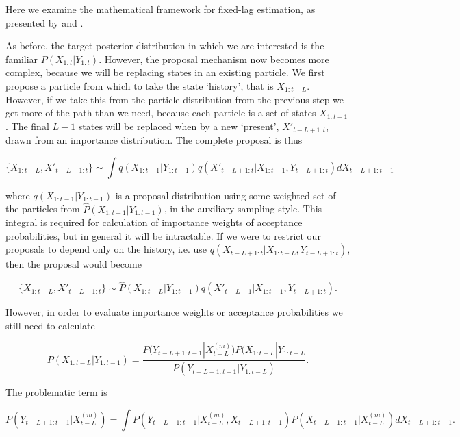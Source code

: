 Here we examine the mathematical framework for fixed-lag estimation, as presented by \cite{Doucet2006} and \cite{Briers2006}.

As before, the target posterior distribution in which we are interested is the familiar $P(X_{1:t}|Y_{1:t})$. However, the proposal mechanism now becomes more complex, because we will be replacing states in an existing particle. We first propose a particle from which to take the state `history', that is $X_{1:t-L}$. However, if we take this from the particle distribution from the previous step we get more of the path than we need, because each particle is a set of states $X_{1:t-1}$. The final $L-1$ states will be replaced when by a new `present', $X'_{t-L+1:t}$, drawn from an importance distribution. The complete proposal is thus

\begin{equation}
\{X_{1:t-L}, X'_{t-L+1:t}\} \sim \int q(X_{1:t-1}|Y_{1:t-1}) q(X'_{t-L+1:t}|X_{1:t-1}, Y_{t-L+1:t}) dX_{t-L+1:t-1}
\label{eq:DumbFLProposal1}
\end{equation}

where $q(X_{1:t-1}|Y_{1:t-1})$ is a proposal distribution using some weighted set of the particles from $\hat{P}(X_{1:t-1}|Y_{1:t-1})$, in the auxiliary sampling style. This integral is required for calculation of importance weights of acceptance probabilities, but in general it will be intractable. If we were to restrict our proposals to depend only on the history, i.e. use $q(X_{t-L+1:t}|X_{1:t-L}, Y_{t-L+1:t})$, then the proposal would become

\begin{equation}
\{X_{1:t-L}, X'_{t-L+1:t}\} \sim \hat{P}(X_{1:t-L}|Y_{1:t-1}) q(X'_{t-L+1}|X_{1:t-1}, Y_{t-L+1:t}).
\label{eq:DumbFLProposal2}
\end{equation}

However, in order to evaluate importance weights or acceptance probabilities we still need to calculate

\begin{equation}
P(X_{1:t-L}|Y_{1:t-1}) = \frac{P(Y_{t-L+1:t-1}|X_{t-L}^{(m)}) P(X_{1:t-L}|Y_{1:t-L} }{P(Y_{t-L+1:t-1}|Y_{1:t-L})}.
\end{equation}

The problematic term is

\begin{equation}
P(Y_{t-L+1:t-1}|X^{(m)}_{t-L}) = \int P(Y_{t-L+1:t-1}|X^{(m)}_{t-L}, X_{t-L+1:t-1}) P(X_{t-L+1:t-1}|X^{(m)}_{t-L}) dX_{t-L+1:t-1}.
\end{equation}

